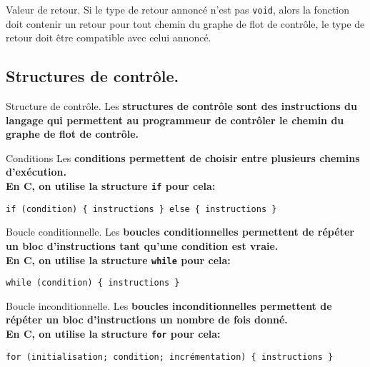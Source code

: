\documentclass[french, 11pt]{article}
\begin{document}
\begin{defi}{Valeur de retour.}{}
    Si le type de retour annoncé n'est pas \texttt{void}, alors la fonction doit contenir un retour pour tout chemin du graphe de flot de contrôle, le type de retour doit être compatible avec celui annoncé.
\end{defi}

\subsection{Structures de contrôle.}

\begin{defi}{Structure de contrôle.}{}
    Les \bf{structures de contrôle} sont des instructions du langage qui permettent au programmeur de contrôler le chemin du graphe de flot de contrôle.
\end{defi}

\begin{defi}{Conditions}{}
    Les \bf{conditions} permettent de choisir entre plusieurs chemins d'exécution.\\
    En C, on utilise la structure \texttt{if} pour cela:
    \begin{center}
        \texttt{if (condition) \{ instructions \} else \{ instructions \}}
    \end{center}
\end{defi}

\begin{defi}{Boucle conditionnelle.}{}
    Les \bf{boucles conditionnelles} permettent de répéter un bloc d'instructions tant qu'une condition est vraie.\\
    En C, on utilise la structure \texttt{while} pour cela:
    \begin{center}
        \texttt{while (condition) \{ instructions \}}
    \end{center}
\end{defi}

\begin{defi}{Boucle inconditionnelle.}
    Les \bf{boucles inconditionnelles} permettent de répéter un bloc d'instructions un nombre de fois donné.\\
    En C, on utilise la structure \texttt{for} pour cela:
    \begin{center}
        \texttt{for (initialisation; condition; incrémentation) \{ instructions \}}
    \end{center}
\end{defi}
\end{document}
